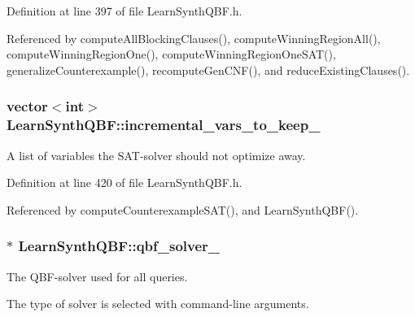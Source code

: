 Definition at line 397 of file Learn\-Synth\-Q\-B\-F.\-h.



Referenced by compute\-All\-Blocking\-Clauses(), compute\-Winning\-Region\-All(), compute\-Winning\-Region\-One(), compute\-Winning\-Region\-One\-S\-A\-T(), generalize\-Counterexample(), recompute\-Gen\-C\-N\-F(), and reduce\-Existing\-Clauses().

\hypertarget{classLearnSynthQBF_a227ff215ffb411e57686aa3d8e7f7026}{
\subsubsection[{incremental\-\_\-vars\-\_\-to\-\_\-keep\-\_\-}]{\setlength{\rightskip}{0pt plus 5cm}vector$<$int$>$ Learn\-Synth\-Q\-B\-F\-::incremental\-\_\-vars\-\_\-to\-\_\-keep\-\_\-\hspace{0.3cm}{\ttfamily [protected]}}}\label{classLearnSynthQBF_a227ff215ffb411e57686aa3d8e7f7026}


A list of variables the S\-A\-T-\/solver should not optimize away. 



Definition at line 420 of file Learn\-Synth\-Q\-B\-F.\-h.



Referenced by compute\-Counterexample\-S\-A\-T(), and Learn\-Synth\-Q\-B\-F().

\hypertarget{classLearnSynthQBF_a8b4c4279f543a0adea992fccf22009f4}{
\subsubsection[{qbf\-\_\-solver\-\_\-}]{$\ast$ Learn\-Synth\-Q\-B\-F\-::qbf\-\_\-solver\-\_\-\hspace{0.3cm}{\ttfamily [protected]}}}\label{classLearnSynthQBF_a8b4c4279f543a0adea992fccf22009f4}


The Q\-B\-F-\/solver used for all queries. 

The type of solver is selected with command-\/line arguments. 

